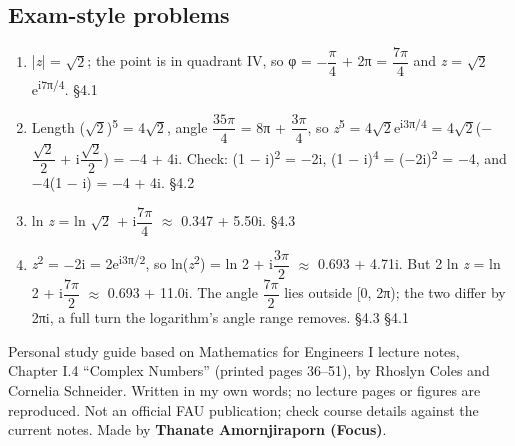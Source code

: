 \documentclass[11pt]{article}
\begin{document}
\begin{keepsection}\subsection{Exam-style problems}

\begin{enumerate}
\item |\textit{z}| = \ensuremath{\sqrt{2}}; the point is in quadrant IV, so φ = \ensuremath{-}{\small\ensuremath{\dfrac{π}{4}}} + 2π = {\small\ensuremath{\dfrac{7π}{4}}} and \textit{z} = \ensuremath{\sqrt{2}}e\textsuperscript{i7π/4}. \hfill{\small\color{FAUblue}§4.1}
\item Length (\ensuremath{\sqrt{2}})\textsuperscript{5} = 4\ensuremath{\sqrt{2}}, angle {\small\ensuremath{\dfrac{35π}{4}}} = 8π + {\small\ensuremath{\dfrac{3π}{4}}}, so \textit{z}\textsuperscript{5} = 4\ensuremath{\sqrt{2}}e\textsuperscript{i3π/4} = 4\ensuremath{\sqrt{2}}(\ensuremath{-}{\small\ensuremath{\dfrac{\sqrt{2}}{2}}} + i{\small\ensuremath{\dfrac{\sqrt{2}}{2}}}) = \ensuremath{-}4 + 4i. Check: (1 \ensuremath{-} i)\textsuperscript{2} = \ensuremath{-}2i, (1 \ensuremath{-} i)\textsuperscript{4} = (\ensuremath{-}2i)\textsuperscript{2} = \ensuremath{-}4, and \ensuremath{-}4(1 \ensuremath{-} i) = \ensuremath{-}4 + 4i. \hfill{\small\color{FAUblue}§4.2}
\item ln \textit{z} = ln \ensuremath{\sqrt{2}} + i{\small\ensuremath{\dfrac{7π}{4}}} \ensuremath{\approx} 0.347 + 5.50i. \hfill{\small\color{FAUblue}§4.3}
\item \textit{z}\textsuperscript{2} = \ensuremath{-}2i = 2e\textsuperscript{i3π/2}, so ln(\textit{z}\textsuperscript{2}) = ln 2 + i{\small\ensuremath{\dfrac{3π}{2}}} \ensuremath{\approx} 0.693 + 4.71i. But 2 ln \textit{z} = ln 2 + i{\small\ensuremath{\dfrac{7π}{2}}} \ensuremath{\approx} 0.693 + 11.0i. The angle {\small\ensuremath{\dfrac{7π}{2}}} lies outside [0, 2π); the two differ by 2πi, a full turn the logarithm’s angle range removes. \hfill{\small\color{FAUblue}§4.3} \hfill{\small\color{FAUblue}§4.1}
\end{enumerate}

\end{keepsection}

\vfill{\small Personal study guide based on Mathematics for Engineers I lecture notes, Chapter I.4 “Complex Numbers” (printed pages 36–51), by Rhoslyn Coles and Cornelia Schneider. Written in my own words; no lecture pages or figures are reproduced. Not an official FAU publication; check course details against the current notes. Made by \textbf{Thanate Amornjiraporn (Focus)}.}
\end{document}
